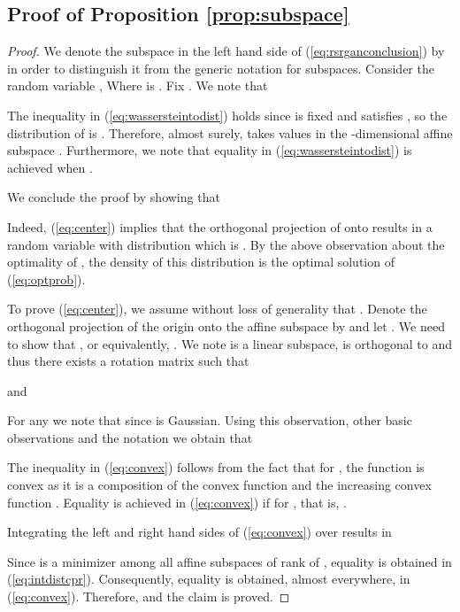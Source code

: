 \documentclass{article} \usepackage{iclr2020_conference,times}
\def\eqref#1{(\ref{#1})}
\begin{document}
\subsection{Proof of Proposition \ref{prop:subspace}}
\label{sec:proofsubspace}

\begin{proof}We denote the subspace  in the left hand side of \eqref{eq:rsrganconclusion} by  in order to distinguish it from the generic notation  for subspaces. 
Consider the random variable , Where  is . Fix . We note that 

The inequality in \eqref{eq:wassersteintodist} holds since  is fixed and  satisfies , so the distribution of  is . Therefore, almost surely,  takes values in the -dimensional affine subspace .
Furthermore, we note that equality in \eqref{eq:wassersteintodist} is achieved when . 

We conclude the proof by showing that 

Indeed, \eqref{eq:center} implies that the orthogonal projection of  onto 
results in a random variable with distribution  which is . By the above observation about the optimality of , the density of this distribution is the optimal solution of \eqref{eq:optprob}.

To prove \eqref{eq:center}, we assume without loss of generality that . Denote the orthogonal projection of the origin onto the affine subspace  by 
and let . We need to show that 
, or equivalently, . We note  is a linear subspace,  is orthogonal to   and thus there exists a rotation matrix  such that 

and


For any  we note that  since  is Gaussian. Using this observation, other basic observations and the notation  we obtain that
\allowdisplaybreaks


The inequality in \eqref{eq:convex} follows from the fact that for  , the function  is convex as it is a composition of the convex function  and the increasing convex function . Equality is achieved in \eqref{eq:convex} if  for , that is, . 


Integrating the left and right hand sides of \eqref{eq:convex} over  results in 

Since  is a minimizer among all affine subspaces of rank  of  
, equality is obtained in \eqref{eq:intdistcpr}. Consequently, equality is obtained, almost everywhere, in \eqref{eq:convex}. Therefore,  and the claim is proved.
\end{proof}
\end{document}
